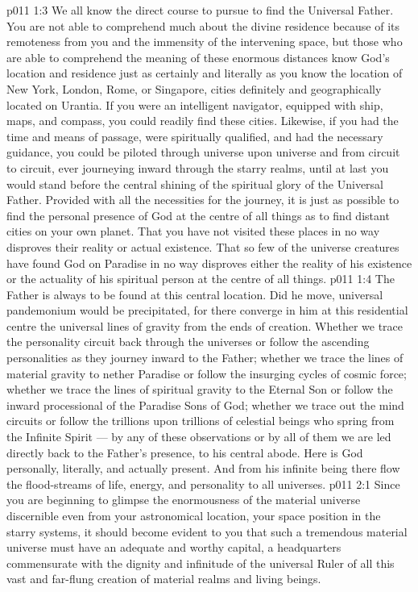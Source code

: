 \vs p011 1:3 \pc We all know the direct course to pursue to find the Universal Father. You are not able to comprehend much about the divine residence because of its remoteness from you and the immensity of the intervening space, but those who are able to comprehend the meaning of these enormous distances know God’s location and residence just as certainly and literally as you know the location of New York, London, Rome, or Singapore, cities definitely and geographically located on Urantia. If you were an intelligent navigator, equipped with ship, maps, and compass, you could readily find these cities. Likewise, if you had the time and means of passage, were spiritually qualified, and had the necessary guidance, you could be piloted through universe upon universe and from circuit to circuit, ever journeying inward through the starry realms, until at last you would stand before the central shining of the spiritual glory of the Universal Father. Provided with all the necessities for the journey, it is just as possible to find the personal presence of God at the centre of all things as to find distant cities on your own planet. That you have not visited these places in no way disproves their reality or actual existence. That so few of the universe creatures have found God on Paradise in no way disproves either the reality of his existence or the actuality of his spiritual person at the centre of all things.
\vs p011 1:4 The Father is always to be found at this central location. Did he move, universal pandemonium would be precipitated, for there converge in him at this residential centre the universal lines of gravity from the ends of creation. Whether we trace the personality circuit back through the universes or follow the ascending personalities as they journey inward to the Father; whether we trace the lines of material gravity to nether Paradise or follow the insurging cycles of cosmic force; whether we trace the lines of spiritual gravity to the Eternal Son or follow the inward processional of the Paradise Sons of God; whether we trace out the mind circuits or follow the trillions upon trillions of celestial beings who spring from the Infinite Spirit --- by any of these observations or by all of them we are led directly back to the Father’s presence, to his central abode. Here is God personally, literally, and actually present. And from his infinite being there flow the flood\hyp{}streams of life, energy, and personality to all universes.
\vs p011 2:1 Since you are beginning to glimpse the enormousness of the material universe discernible even from your astronomical location, your space position in the starry systems, it should become evident to you that such a tremendous material universe must have an adequate and worthy capital, a headquarters commensurate with the dignity and infinitude of the universal Ruler of all this vast and far\hyp{}flung creation of material realms and living beings.
